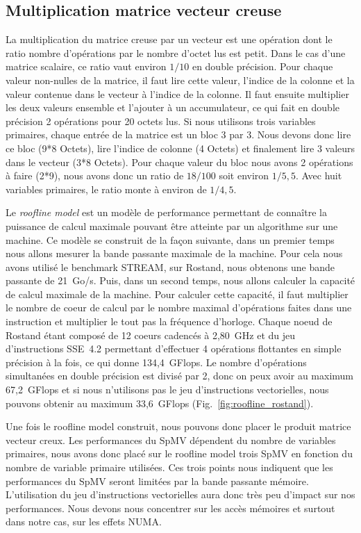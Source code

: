 \subsection{Multiplication matrice vecteur creuse}
La multiplication du matrice creuse par un vecteur est une opération dont le ratio nombre d'opérations par le nombre d'octet lus est petit.
%
Dans le cas d'une matrice scalaire, ce ratio vaut environ $1/10$ en double précision.
%
Pour chaque valeur non-nulles de la matrice, il faut lire cette valeur, l'indice de la colonne et la valeur contenue dans le vecteur à l'indice de la colonne.
%
Il faut ensuite multiplier les deux valeurs ensemble et l'ajouter à un accumulateur, ce qui fait en double précision 2 opérations pour 20 octets lus.
%
Si nous utilisons trois variables primaires, chaque entrée de la matrice est un bloc 3 par 3.
%
Nous devons donc lire ce bloc (9*8 Octets), lire l'indice de colonne (4 Octets) et finalement lire 3 valeurs dans le vecteur (3*8 Octets).
%
Pour chaque valeur du bloc nous avons 2 opérations à faire (2*9), nous avons donc un ratio de $18/100$ soit environ $1/5,5$.
%
Avec huit variables primaires, le ratio monte à environ de $1/4,5$.


Le {\em roofline model} est un modèle de performance permettant de connaître la puissance de calcul maximale pouvant être atteinte par un algorithme sur une machine.
%
Ce modèle se construit de la façon suivante, dans un premier temps nous allons mesurer la bande passante maximale de la machine.
%
Pour cela nous avons utilisé le benchmark STREAM, sur Rostand, nous obtenons une bande passante de 21~Go/s.
%
Puis, dans un second temps, nous allons calculer la capacité de calcul maximale de la machine.
%
Pour calculer cette capacité, il faut multiplier le nombre de coeur de calcul par le nombre maximal d'opérations faites dans une instruction et multiplier le tout pas la fréquence d'horloge.
%
Chaque noeud de Rostand étant composé de 12 coeurs cadencés à 2,80~GHz et du jeu d'instructions SSE~4.2 permettant d'effectuer 4 opérations flottantes en simple précision à la fois, ce qui donne 134,4~GFlops.
%
Le nombre d'opérations simultanées en double précision est divisé par 2, donc on peux avoir au maximum 67,2~GFlops et si nous n'utilisons pas le jeu d'instructions vectorielles, nous pouvons obtenir au maximum 33,6~GFlops (Fig.~\ref{fig:roofline_rostand}).


Une fois le roofline model construit, nous pouvons donc placer le produit matrice vecteur creux.
%
Les performances du SpMV dépendent du nombre de variables primaires, nous avons donc placé sur le roofline model trois SpMV en fonction du nombre de variable primaire utilisées.
%
Ces trois points nous indiquent que les performances du SpMV seront limitées par la bande passante mémoire.
%
L'utilisation du jeu d'instructions vectorielles aura donc très peu d'impact sur nos performances.
%
Nous devons nous concentrer sur les accès mémoires et surtout dans notre cas, sur les effets NUMA.

